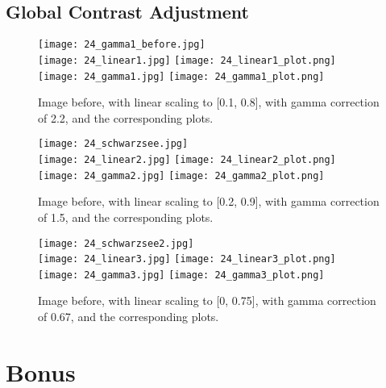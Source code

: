 \documentclass[11pt,a4]{article}
\begin{document}
\newpage
\FloatBarrier
\subsection{Global Contrast Adjustment}

\begin{figure}[htb]
    \begin{center}
    	\texttt{[image: 24\_gamma1\_before.jpg]}\\
        \texttt{[image: 24\_linear1.jpg]}
        \texttt{[image: 24\_linear1\_plot.png]}\\
        \texttt{[image: 24\_gamma1.jpg]}
        \texttt{[image: 24\_gamma1\_plot.png]}
        \caption{Image before, with linear scaling to [0.1, 0.8], with gamma correction of 2.2, and the corresponding plots.}
    \end{center}
\end{figure}


\begin{figure}[htb]
    \begin{center}
    	\texttt{[image: 24\_schwarzsee.jpg]}\\
        \texttt{[image: 24\_linear2.jpg]}
        \texttt{[image: 24\_linear2\_plot.png]}\\
        \texttt{[image: 24\_gamma2.jpg]}
        \texttt{[image: 24\_gamma2\_plot.png]}
        \caption{Image before, with linear scaling to [0.2, 0.9], with gamma correction of 1.5, and the corresponding plots.}
    \end{center}
\end{figure}

\begin{figure}[htb]
    \begin{center}
    	\texttt{[image: 24\_schwarzsee2.jpg]}\\
        \texttt{[image: 24\_linear3.jpg]}
        \texttt{[image: 24\_linear3\_plot.png]}\\
        \texttt{[image: 24\_gamma3.jpg]}
        \texttt{[image: 24\_gamma3\_plot.png]}
        \caption{Image before, with linear scaling to [0, 0.75], with gamma correction of 0.67, and the corresponding plots.}
    \end{center}
\end{figure}

\newpage
\FloatBarrier
\section{Bonus}
\end{document}
